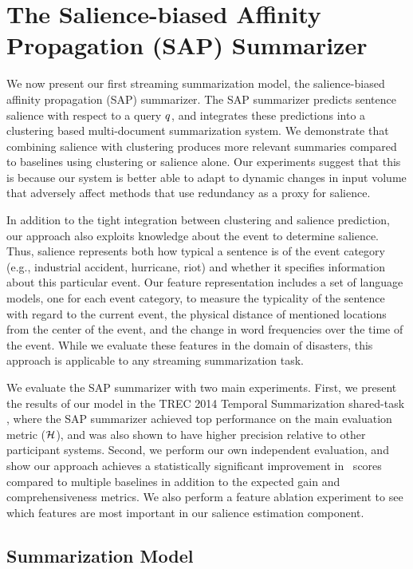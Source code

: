 \section{The Salience-biased Affinity Propagation (SAP) Summarizer}
\label{sec:sap}

We now present our first streaming summarization model, the salience-biased
affinity propagation (SAP) summarizer. The SAP summarizer predicts sentence
salience with respect to a query $q$, and integrates these predictions
into a clustering based multi-document summarization system. We demonstrate
that combining salience with clustering produces more relevant summaries
compared to baselines using clustering or salience alone.  Our experiments
suggest that this is because our system is better able to adapt to dynamic
changes in input volume that adversely affect methods that use redundancy as a
proxy for salience. 

In addition to the tight integration between clustering and salience
prediction, our approach also exploits knowledge about the event to determine
salience. Thus, salience represents both how typical a sentence is of the event
category (e.g., industrial accident, hurricane, riot) and whether it specifies
information about this particular event.  Our feature representation includes a
set of language models, one for each event category, to measure the typicality
of the sentence with regard to the current event, the physical distance of
mentioned locations from the center of the event, and the change in word
frequencies over the time of the event.  While we evaluate these features in
the domain of disasters, this approach is applicable to any streaming
summarization task.

We evaluate the SAP summarizer with two main experiments. First, we present the
results of our model in the TREC 2014 Temporal Summarization shared-task
\citep{aslam2014}, where the SAP summarizer achieved top performance on the
main evaluation metric ($\mathcal{H}$), and was also shown to have higher precision
relative to other participant systems.  Second, we perform our own independent
evaluation, and show our approach achieves a statistically significant
improvement in \rouge~scores compared to multiple baselines in addition to the
expected gain and comprehensiveness metrics.  We also perform a feature
ablation experiment to see which features are most important in our salience
estimation component.

\subsection{Summarization Model}
\label{sec:methods}

